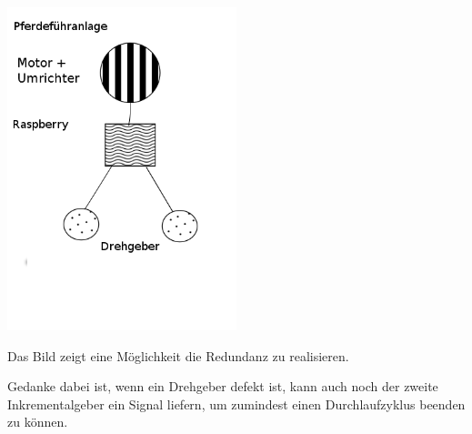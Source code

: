 \documentclass[12pt]{scrartcl}
\begin{document}
\begin{center}
	\includegraphics[width=0.5\textwidth]{Redundanz}
\end{center}

Das Bild zeigt eine Möglichkeit die Redundanz zu realisieren.

Gedanke dabei ist, wenn ein Drehgeber defekt ist, kann auch noch der zweite Inkrementalgeber ein Signal liefern, um zumindest einen Durchlaufzyklus beenden zu können. 
\end{document}
